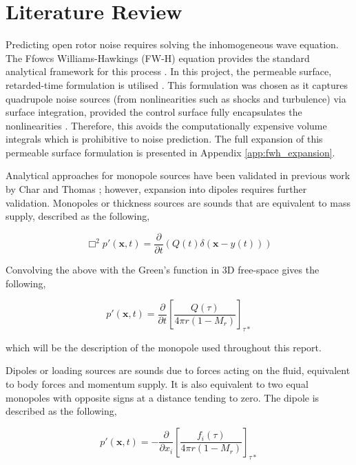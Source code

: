 \chapter{Literature Review} \label{sec:litrev}

Predicting open rotor noise requires solving the inhomogeneous wave equation. The Ffowcs Williams-Hawkings (FW-H) equation provides the standard analytical framework for this process \cite{Dowling1983}. In this project, the permeable surface, retarded-time formulation is utilised \cite{FfowcsWilliams1969, Brentner1997, Najafi-Yazdi2011}. This formulation was chosen as it captures quadrupole noise sources (from nonlinearities such as shocks and turbulence) via surface integration, provided the control surface fully encapsulates the nonlinearities \cite{Morgans2004}. Therefore, this avoids the computationally expensive volume integrals which is prohibitive to noise prediction. The full expansion of this permeable surface formulation is presented in Appendix \ref{app:fwh_expansion}.

Analytical approaches for monopole sources have been validated in previous work by Char and Thomas \cite{TingChar2024, Thomas2012}; however, expansion into dipoles requires further validation. Monopoles or thickness sources are sounds that are equivalent to mass supply, described as the following,

\begin{equation}
    \Box^2p'(\bm{x},t) = \frac{\partial}{\partial t} (Q(t) \delta(\bm{x} - y(t)))
    \label{eq:monopole_def}
\end{equation}

Convolving the above with the Green's function in 3D free-space gives the following,

\begin{equation}
    p'(\bm{x}, t)= \frac{\partial}{\partial t} \left[ \frac{Q(\tau)}{4\pi r (1-M_r)}\right]_{\tau*}
    \label{eq:monopole_convolved}
\end{equation}

which will be the description of the monopole used throughout this report.

Dipoles or loading sources are sounds due to forces acting on the fluid, equivalent to body forces and momentum supply. It is also equivalent to two equal monopoles with opposite signs at a distance tending to zero. The dipole is described as the following,

\begin{equation}
    p'(\bm{x}, t)=-\frac{\partial}{\partial x_i} \left[\frac{f_i(\tau)}{4\pi r(1-M_r)}\right]_{\tau *}
    \label{eq:dipole_convolved}
\end{equation}

